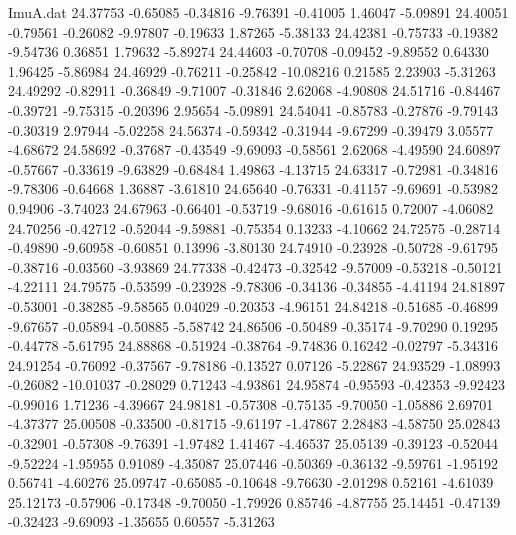 \begin{filecontents}{ImuA.dat}
  24.37753   -0.65085   -0.34816   -9.76391   -0.41005    1.46047   -5.09891
  24.40051   -0.79561   -0.26082   -9.97807   -0.19633    1.87265   -5.38133
  24.42381   -0.75733   -0.19382   -9.54736    0.36851    1.79632   -5.89274
  24.44603   -0.70708   -0.09452   -9.89552    0.64330    1.96425   -5.86984
  24.46929   -0.76211   -0.25842  -10.08216    0.21585    2.23903   -5.31263
  24.49292   -0.82911   -0.36849   -9.71007   -0.31846    2.62068   -4.90808
  24.51716   -0.84467   -0.39721   -9.75315   -0.20396    2.95654   -5.09891
  24.54041   -0.85783   -0.27876   -9.79143   -0.30319    2.97944   -5.02258
  24.56374   -0.59342   -0.31944   -9.67299   -0.39479    3.05577   -4.68672
  24.58692   -0.37687   -0.43549   -9.69093   -0.58561    2.62068   -4.49590
  24.60897   -0.57667   -0.33619   -9.63829   -0.68484    1.49863   -4.13715
  24.63317   -0.72981   -0.34816   -9.78306   -0.64668    1.36887   -3.61810
  24.65640   -0.76331   -0.41157   -9.69691   -0.53982    0.94906   -3.74023
  24.67963   -0.66401   -0.53719   -9.68016   -0.61615    0.72007   -4.06082
  24.70256   -0.42712   -0.52044   -9.59881   -0.75354    0.13233   -4.10662
  24.72575   -0.28714   -0.49890   -9.60958   -0.60851    0.13996   -3.80130
  24.74910   -0.23928   -0.50728   -9.61795   -0.38716   -0.03560   -3.93869
  24.77338   -0.42473   -0.32542   -9.57009   -0.53218   -0.50121   -4.22111
  24.79575   -0.53599   -0.23928   -9.78306   -0.34136   -0.34855   -4.41194
  24.81897   -0.53001   -0.38285   -9.58565    0.04029   -0.20353   -4.96151
  24.84218   -0.51685   -0.46899   -9.67657   -0.05894   -0.50885   -5.58742
  24.86506   -0.50489   -0.35174   -9.70290    0.19295   -0.44778   -5.61795
  24.88868   -0.51924   -0.38764   -9.74836    0.16242   -0.02797   -5.34316
  24.91254   -0.76092   -0.37567   -9.78186   -0.13527    0.07126   -5.22867
  24.93529   -1.08993   -0.26082  -10.01037   -0.28029    0.71243   -4.93861
  24.95874   -0.95593   -0.42353   -9.92423   -0.99016    1.71236   -4.39667
  24.98181   -0.57308   -0.75135   -9.70050   -1.05886    2.69701   -4.37377
  25.00508   -0.33500   -0.81715   -9.61197   -1.47867    2.28483   -4.58750
  25.02843   -0.32901   -0.57308   -9.76391   -1.97482    1.41467   -4.46537
  25.05139   -0.39123   -0.52044   -9.52224   -1.95955    0.91089   -4.35087
  25.07446   -0.50369   -0.36132   -9.59761   -1.95192    0.56741   -4.60276
  25.09747   -0.65085   -0.10648   -9.76630   -2.01298    0.52161   -4.61039
  25.12173   -0.57906   -0.17348   -9.70050   -1.79926    0.85746   -4.87755
  25.14451   -0.47139   -0.32423   -9.69093   -1.35655    0.60557   -5.31263

\end{filecontents}
